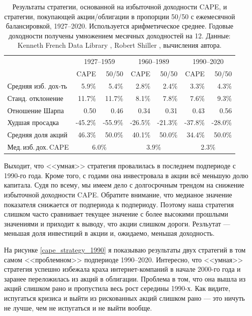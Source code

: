 \begin{table}[h!]
\centering
\begin{tabular}{l|r|r|r|r|r|r}
& \multicolumn{2}{c|}{1927--1959} & \multicolumn{2}{c|}{1960--1989} & \multicolumn{2}{c}{1990--2020} \\ 
\cline{2-7}
                       & CAPE    & 50/50   & CAPE    & 50/50   & CAPE    & 50/50 \\ \hline
Средняя изб. дох-ть    & 5.9\%   & 5.4\%   & 2.8\%   & 2.4\%   & 3.3\%   & 4.3\%   \\
Станд. отклонение      & 11.7\%  & 11.7\%  & 8.1\%   & 7.8\%   & 7.6\%   & 9.3\%   \\
Отношение Шарпа        & 0.50    & 0.46    & 0.34    & 0.31    & 0.43    & 0.56    \\
Худшая просадка        & -45.2\% & -55.9\% & -26.5\% & -21.3\% & -37.8\% & -28.0\% \\
Средняя доля акций     & 46.3\%  & 50.0\%  & 40.1\%  & 50.0\%  & 34.4\%  & 50.0\%  \\ 
\cline{2-7}
Мед.\,изб.\,дох.\,CAPE & \multicolumn{2}{c|}{6.0\%} & \multicolumn{2}{c|}{3.9\%} & \multicolumn{2}{c}{2.3\%} 
\end{tabular}
\caption{Результаты стратегии, основанной на избыточной доходности CAPE, и стратегии, покупающей акции/облигации в пропорции 50/50 с ежемесячной балансировкой, 1927--2020. Используется арифметическое среднее. Годовые доходности получены умножением месячных доходностей на 12. Данные: Kenneth French Data Library \cite{kennethFrench}, Robert Shiller \cite{shillerOnline}, вычисления автора.}
\label{cape_strategy_three_periods_table}
\end{table}

Выходит, что <<умная>> стратегия провалилась в последнем подпериоде с 1990-го года. Кроме того, с годами она инвестровала в акции всё меньшую долю капитала. Судя по всему, мы имеем дело с долгосрочным трендом на снижение избыточной доходности CAPE. Обратите внимание, что медианое значение показателя снижается от подпериода к подпериоду. Поэтому наша стратегия слишком часто сравнивает текущее значение с более высокими прошлыми значениями и приходит к выводу, что акции слишком дороги. Резльутат --- меньшая доля инвестиций в акции и, ожидаемо, меньшая доходность.

На рисунке \ref{cape_strategy_1990} я показываю результаты двух стратегий в том самом <<проблемном>> подпериоде 1990--2020. Интересно, что <<умная>> стратегия успешно избежала краха интернет-компаний в начале 2000-го года и заранее переложилась из акций в облигации. Проблема в том, что она вышла из акций слишком рано и пропустила весь рост середины 1990-х. Как видите, испугаться кризиса и выйти из рискованных акций слишком рано --- это ничуть не лучше, чем не испугаться и не выйти вообще.

